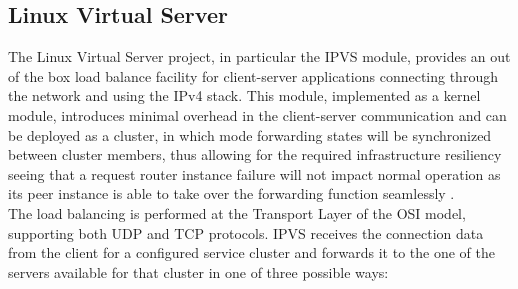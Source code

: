\subsection{Linux Virtual Server}
The Linux Virtual Server project, in particular the \gls{IPVS} module, provides an out of the box load balance facility for client-server applications connecting through the network and using the \gls{IPv4} stack.
This module, implemented as a kernel module, introduces minimal overhead in the client-server communication and can be deployed as a cluster, in which mode forwarding states will be synchronized between cluster members, thus allowing for the required infrastructure resiliency seeing that a request router instance failure will not impact normal operation as its peer instance is able to take over the forwarding function seamlessly \cite{LVSSync}.\\
%
The load balancing is performed at the Transport Layer of the \gls{OSI} model, supporting both \gls{UDP} and \gls{TCP} protocols.
IPVS receives the connection data from the client for a configured service cluster and forwards it to the one of the servers available for that cluster in one of three possible ways\cite{IPVSHow}:
